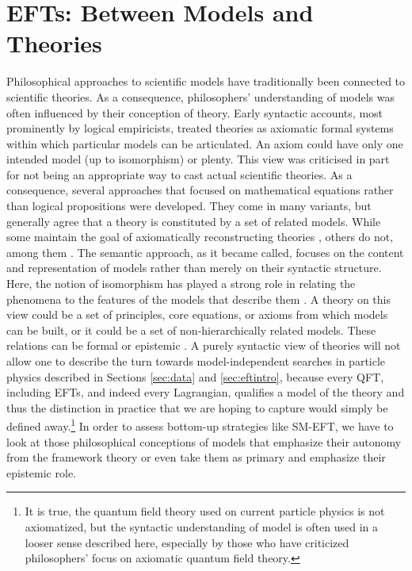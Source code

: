 \section{EFTs: Between Models and Theories} 		%
\label{sec:models} 

Philosophical approaches to scientific models have traditionally been connected to scientific theories. 
As a consequence, philosophers' understanding of models was often influenced by their conception of theory.
Early syntactic accounts, most prominently by logical empiricists, treated theories as axiomatic formal systems \citep[such as][]{carnap59,hempel66}
within which particular models can be articulated. 
An axiom could have only one intended model (up to isomorphism) or plenty. 
This view was criticised in part for not being an appropriate way to cast actual scientific theories. 
As a consequence, several approaches that focused on mathematical equations rather than logical propositions were developed.
They come in many variants, but generally agree that a theory is constituted by a set of related models. 
While some maintain the goal of axiomatically reconstructing theories \citep[among them][]{suppes60}, others do not, among them \citep{giere88}.
The semantic approach, as it became called, focuses on the content and representation of models rather than merely on their syntactic structure.
Here, the notion of isomorphism has played a strong role in relating the phenomena to the features of the models that describe them \citep{vf80}. 
A theory on this view could be a set of principles, core equations, or axioms from which models can be built, or it could be a set of non-hierarchically related models. These relations can be formal \citep{suppes60} or epistemic \citep{giere88}.
A purely syntactic view of theories will not allow one to describe the turn towards model-independent searches in particle physics described in Sections \ref{sec:data} and \ref{sec:eftintro}, because every QFT, including EFTs, and indeed every Lagrangian, qualifies a model of the theory and thus the distinction in practice that we are hoping to capture would simply be defined away.\footnote{It is true, the quantum field theory used on current particle physics is not axiomatized, but the syntactic understanding of model is often used in a looser sense described here, especially by those who have criticized philosophers' focus on axiomatic quantum field theory.}
In order to assess bottom-up strategies like SM-EFT, we have to look at those philosophical conceptions of models that emphasize their autonomy from the framework theory or even take them as primary and emphasize their epistemic role. 

